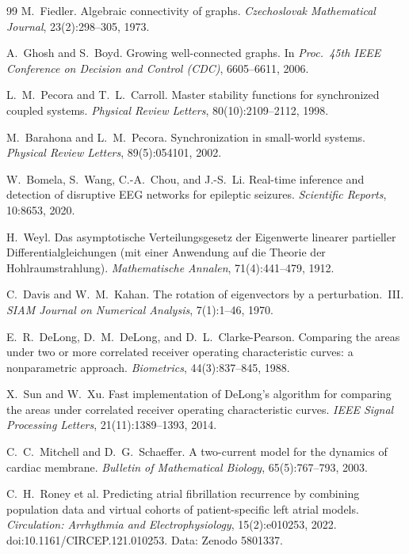 \documentclass[11pt]{article}
\theoremstyle{definition}
\begin{document}
\begin{thebibliography}{99}
 M.~Fiedler. Algebraic connectivity of graphs.
\emph{Czechoslovak Mathematical Journal}, 23(2):298--305, 1973.

 A.~Ghosh and S.~Boyd. Growing well-connected graphs. In
\emph{Proc.\ 45th IEEE Conference on Decision and Control (CDC)}, 6605--6611, 2006.

 L.~M.~Pecora and T.~L.~Carroll. Master stability functions
for synchronized coupled systems. \emph{Physical Review Letters},
80(10):2109--2112, 1998.

 M.~Barahona and L.~M.~Pecora. Synchronization in
small-world systems. \emph{Physical Review Letters}, 89(5):054101, 2002.

 W.~Bomela, S.~Wang, C.-A.~Chou, and J.-S.~Li. Real-time
inference and detection of disruptive EEG networks for epileptic seizures.
\emph{Scientific Reports}, 10:8653, 2020.

 H.~Weyl. Das asymptotische Verteilungsgesetz der Eigenwerte
linearer partieller Differentialgleichungen (mit einer Anwendung auf die Theorie
der Hohlraumstrahlung). \emph{Mathematische Annalen},
71(4):441--479, 1912.

 C.~Davis and W.~M.~Kahan. The rotation of eigenvectors
by a perturbation.\ III. \emph{SIAM Journal on Numerical Analysis}, 7(1):1--46, 1970.

 E.~R.~DeLong, D.~M.~DeLong, and D.~L.~Clarke-Pearson.
Comparing the areas under two or more correlated receiver operating
characteristic curves: a nonparametric approach. \emph{Biometrics},
44(3):837--845, 1988.

 X.~Sun and W.~Xu. Fast implementation of DeLong's algorithm
for comparing the areas under correlated receiver operating characteristic
curves. \emph{IEEE Signal
Processing Letters}, 21(11):1389--1393, 2014.

 C.~C.~Mitchell and D.~G.~Schaeffer. A two-current model
for the dynamics of cardiac membrane. \emph{Bulletin of Mathematical Biology},
65(5):767--793, 2003.

 C.~H.~Roney et al. Predicting atrial fibrillation recurrence
by combining population data and virtual cohorts of patient-specific left atrial
models. \emph{Circulation: Arrhythmia and Electrophysiology}, 15(2):e010253, 2022.
doi:10.1161/CIRCEP.121.010253. Data: Zenodo 5801337.


\end{thebibliography}
\end{document}
